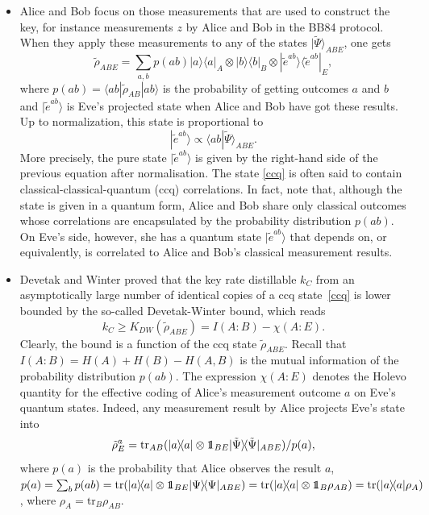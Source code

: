 \documentclass[a4paper]{article}
\def\tr{\mbox{tr}}
\def\one{\leavevmode\hbox{\small1\normalsize\kern-.33em1}}
\def\bra#1{\langle#1|} \def\ket#1{|#1\rangle}
\def\proj#1{\ket{#1}\!\bra{#1}}
\begin{document}
\begin{itemize}
\item Alice and Bob focus on those measurements that are used to construct the key, for instance measurements $z$ by Alice and Bob in the BB84 protocol. When they apply these measurements to any of the states $\ket{\tilde\Psi}_{ABE}$, one gets
\begin{equation}\label{ccq}
    \tilde\rho_{ABE}=\sum_{a,b}p(ab)\proj{a}_A \otimes\proj{b}_B\otimes\proj{\tilde e^{ab}}_E
    ,
\end{equation}
where $p(ab)=\bra{ab}\tilde\rho_{AB}\ket{ab}$ is the probability of
getting outcomes $a$ and $b$ and $\ket{\tilde e^{ab}}$ is Eve's projected
state when Alice and Bob have got these results. Up to normalization, this state is proportional to
\begin{equation}\label{evestate}
    \ket{\tilde e^{ab}}\propto\langle ab\ket{\tilde\Psi}_{ABE} .
\end{equation}
More precisely, the pure state $\ket{\tilde e^{ab}}$ is given by the right-hand side of the previous equation after normalisation.
The state \eqref{ccq} is often said to contain
classical-classical-quantum (ccq) correlations. In fact, note that, although
the state is given in a quantum form, Alice and Bob share only
classical outcomes whose correlations are encapsulated by the
probability distribution $p(ab)$. On Eve's side, however, she has
a quantum state $\ket{\tilde e^{ab}}$ that depends on, or equivalently, is correlated to Alice and Bob's classical
measurement results.
\item Devetak and Winter proved that the key rate distillable $k_C$ from an asymptotically large number of identical copies of a ccq state~\eqref{ccq} is lower bounded by the so-called Devetak-Winter bound, which reads~\cite{dwrate}
\begin{equation}\label{dwbound}
    k_C\geq K_{DW}(\tilde\rho_{ABE})=I(A:B)-\chi(A:E) .
\end{equation}
Clearly, the bound is a function of the ccq state $\tilde\rho_{ABE}$.
Recall that $I(A:B)=H(A)+H(B)-H(A,B)$ is the mutual information of the
probability distribution $p(ab)$. The expression $\chi(A:E)$ denotes the
Holevo quantity\cite{Holevo} for the effective coding of Alice's measurement
outcome $a$ on Eve's quantum states. Indeed, any measurement result by
Alice projects Eve's state into
\begin{equation}
    \tilde\rho_E^a=\tr_{AB}(\proj a\otimes\one_{BE}\proj{\tilde\Psi}_{ABE})/p(a),
\end{equation}
where $p(a)$ is the probability that Alice observes the result $a$, $p(a)=\sum_bp(ab)=\tr(\proj a \otimes \one_{BE}\proj{\Psi}_{ABE})=\tr(\proj a\otimes\one_B\rho_{AB})=\tr(\proj a\rho_A)$, where $\rho_A=\tr_B\rho_{AB}$.

\end{itemize}
\end{document}

